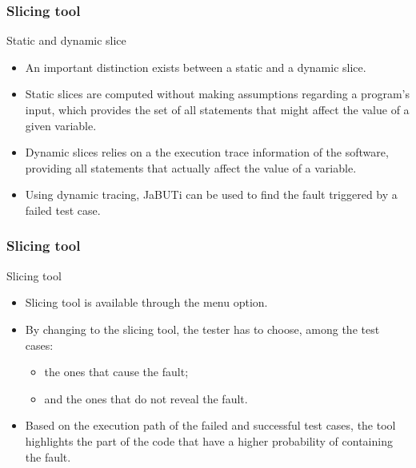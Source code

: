 \begin{frame}
\frametitle{Slicing tool}

\begin{block}{Static and dynamic slice}
\begin{itemize}
	\item An important distinction exists between a static and a dynamic slice.

	\item Static slices are computed without making assumptions regarding a
	program's input, which provides the set of all statements that might affect
	the value of a given variable.

	\item Dynamic slices relies on a the execution trace information of the
	software, providing all statements that actually affect the value of
	a variable.
\end{itemize}
\end{block}

\begin{block}{}
\begin{itemize}
	\item Using dynamic tracing, JaBUTi can be used to find the fault
	triggered by a failed test case.
\end{itemize}
\end{block}
\end{frame}




\begin{frame}[parent={cmap:jabuti-slicing-tool},hasnext=true,hasprev=true]
\frametitle{Slicing tool}
\label{concept:slicing-tool}
\label{concept:jabuti-slicing-tool}
\label{concept:software-slicing-tool}

\begin{block:fact}{Slicing tool}
\begin{itemize}
	\item Slicing tool is available through the 
	menu option.

	\item By changing to the slicing tool, the tester has to choose, among
	the test cases:
	\begin{itemize}
		\item the ones that cause the fault;
		\item and the ones that do not reveal the fault.
	\end{itemize}

	\item Based on the execution path of the failed and successful test cases,
	the tool highlights the part of the code that have a higher probability of
	containing the fault.
\end{itemize}
\end{block:fact}
\end{frame}


